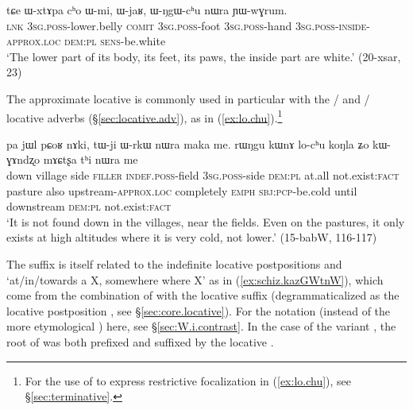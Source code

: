    \begin{exe}
\ex \label{ex:WNgW.chu}
 \gll tɕe ɯ-xtɤpa cʰo ɯ-mi, ɯ-jaʁ, ɯ-ŋgɯ-cʰu nɯra ɲɯ-wɣrum. \\
\textsc{lnk} \textsc{3sg}.\textsc{poss}-lower.belly \textsc{comit}  \textsc{3sg}.\textsc{poss}-foot  \textsc{3sg}.\textsc{poss}-hand  \textsc{3sg}.\textsc{poss}-\textsc{inside}-\textsc{approx}.\textsc{loc} \textsc{dem}:\textsc{pl}  \textsc{sens}-be.white \\
\glt `The lower part of its body, its feet, its paws, the inside part are white.' (20-xsar, 23)
    \end{exe}

The approximate locative  is commonly used in particular with the  /  and  /  locative adverbs (§\ref{sec:locative.adv}), as in (\ref{ex:lo.chu}).\footnote{For the use of  to express restrictive focalization in (\ref{ex:lo.chu}), see §\ref{sec:terminative}. }

\begin{exe}
\ex \label{ex:lo.chu}
 \gll  pa jɯl pɕoʁ nɤki, tɯ-ji ɯ-rkɯ nɯra maka me. rɯŋgu kɯnɤ lo-cʰu koŋla ʑo kɯ-ɣɤndʐo mɤɕtʂa tʰi nɯra me \\
 down village side \textsc{filler} \textsc{indef}.\textsc{poss}-field \textsc{3sg}.\textsc{poss}-side \textsc{dem}:\textsc{pl} at.all not.exist:\textsc{fact} pasture also upstream-\textsc{approx}.\textsc{loc} completely \textsc{emph} \textsc{sbj}:\textsc{pcp}-be.cold until downstream \textsc{dem}:\textsc{pl} not.exist:\textsc{fact} \\
\glt  `It is not found down in the villages, near the fields. Even on the pastures, it only exists at high altitudes where it is very cold, not lower.' (15-babW, 116-117)
\end{exe}
 
The suffix  is itself related to the indefinite locative postpositions  and  `at/in/towards a X, somewhere where X' as in (\ref{ex:schiz.kazGWtnW}), which come from the combination of  with the locative suffix  (degrammaticalized as the locative postposition , see §\ref{sec:core.locative}). For the notation  (instead of the more etymological ) here, see §\ref{sec:W.i.contrast}. In the case of the variant , the root of  was both prefixed and suffixed by the locative .


